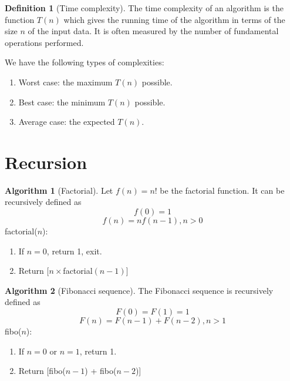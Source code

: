\documentclass[10pt, a4paper]{extarticle}
\theoremstyle{definition}
\newtheorem{alg}{Algorithm}
\newtheorem{defn}{Definition}
\begin{document}
	\begin{defn}[Time complexity]
		The time complexity of an algorithm is the function $T(n)$ which gives the running time of the algorithm in terms of the size $n$ of the input data. It is often measured by the number of fundamental operations performed.

		We have the following types of complexities:
		\begin{enumerate}
			\item Worst case: the maximum $T(n)$ possible.
			\item Best case: the minimum $T(n)$ possible.
			\item Average case: the expected $T(n)$.
	\end{enumerate}
	\end{defn}

	\section{Recursion}
	\begin{alg}[Factorial]
		Let $f(n)=n!$ be the factorial function. It can be recursively defined as
		\[f(0)=1\]\[f(n)=nf(n-1), n>0\]
		factorial($n$):
		\begin{enumerate}
			\item If $n=0$, return 1, exit.
			\item Return $[n\times$factorial$(n-1)]$
	\end{enumerate}
	\end{alg}
	\begin{alg}[Fibonacci sequence]
		The Fibonacci sequence is recursively defined as
		\[F(0)=F(1)=1\]
		\[F(n)=F(n-1)+F(n-2),n>1\]
		fibo($n$):
		\begin{enumerate}
			\item If $n=0$ or $n=1$, return 1.
			\item Return [fibo($n-1$) + fibo($n-2$)]
	\end{enumerate}
	\end{alg}
\end{document}
